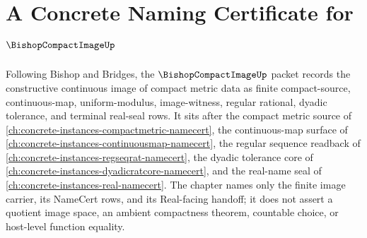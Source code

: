 \chapter{A Concrete Naming Certificate for $\BishopCompactImageUp$}
\label{ch:concrete-instances-bishop-compact-image-namecert}

Following Bishop and Bridges, the $\BishopCompactImageUp$ packet records the constructive continuous image of compact metric data as finite compact-source, continuous-map, uniform-modulus, image-witness, regular rational, dyadic tolerance, and terminal real-seal rows. It sits after the compact metric source of \autoref{ch:concrete-instances-compactmetric-namecert}, the continuous-map surface of \autoref{ch:concrete-instances-continuousmap-namecert}, the regular sequence readback of \autoref{ch:concrete-instances-regseqrat-namecert}, the dyadic tolerance core of \autoref{ch:concrete-instances-dyadicratcore-namecert}, and the real-name seal of \autoref{ch:concrete-instances-real-namecert}. The chapter names only the finite image carrier, its NameCert rows, and its Real-facing handoff; it does not assert a quotient image space, an ambient compactness theorem, countable choice, or host-level function equality.



